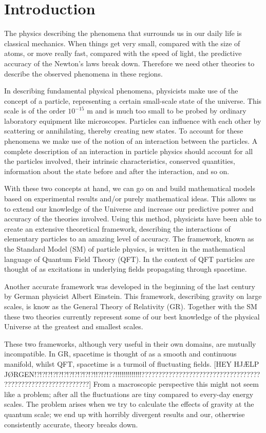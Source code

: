 \section{Introduction}
The physics describing the phenomena that surrounds us in our daily life is classical mechanics. When things get very small, compared with the size of atoms, or move really fast, compared with the speed of light, the predictive accuracy of the Newton's laws break down. Therefore we need other theories to describe the observed phenomena in these regions.

In describing fundamental physical phenomena, physicists make use of the concept of a particle, representing a certain small-scale state of the universe. This scale is of the order $10^{-15}$ m and is much too small to be probed by ordinary laboratory equipment like microscopes. Particles can influence with each other by scattering or annihilating, thereby creating new states. To account for these phenomena we make use of the notion of an interaction between the particles. A complete description of an interaction in particle physics should account for all the particles involved, their intrinsic characteristics, conserved quantities, information about the state before and after the interaction, and so on.

With these two concepts at hand, we can go on and build mathematical models based on experimental results and/or purely mathematical ideas. This allows us to extend our knowledge of the Universe and increase our predictive power and accuracy of the theories involved. Using this method, physicists have been able to create an extensive theoretical framework, describing the interactions of elementary particles to an amazing level of accuracy. The framework, known as the Standard Model (SM) of particle physics, is written in the mathematical language of Quantum Field Theory (QFT). In the context of QFT particles are thought of as excitations in underlying fields propagating through spacetime.

Another accurate framework was developed in the beginning of the last century by German physicist Albert Einstein. This framework, describing gravity on large scales, is know as the General Theory of Relativity (GR). Together with the SM these two theories currently represent some of our best knowledge of the physical Universe at the greatest and smallest scales.

These two frameworks, although very useful in their own domains, are mutually incompatible. In GR, spacetime is thought of as a smooth and continuous manifold, whilst QFT, spacetime is a turmoil of fluctuating fields. [HEY HJÆLP JØRGEN!?!?!?!?!?!?!?!?!?!?!?!!?!?!??!!!!!!!!!!!!!????????????????????????????????????????????????????????????] From a macroscopic perspective this might not seem like a problem; after all the fluctuations are tiny compared to every-day energy scales. The problem arises when we try to calculate the effects of gravity at the quantum scale; we end up with horribly divergent results and our, otherwise consistently accurate, theory breaks down.

